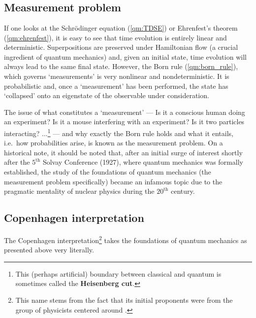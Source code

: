 \section{}
\subsection{Measurement problem}

    If one looks at the Schr\"odinger equation (\cref{qm:TDSE}) or Ehrenfest's theorem (\cref{qm:ehrenfest}), it is easy to see that time evolution is entirely linear and deterministic. Superpositions are preserved under Hamiltonian flow (a crucial ingredient of quantum mechanics) and, given an initial state, time evolution will always lead to the same final state. However, the Born rule (\cref{qm:born_rule}), which governs `measurements' is very nonlinear and nondeterministic. It is probabilistic and, once a `measurement' has been performed, the state has `collapsed' onto an eigenstate of the observable under consideration.

    The issue of what constitutes a `measurement' --- Is it a conscious human doing an experiment? Is it a mouse interfering with an experiment? Is it two particles interacting? ...\footnote{This (perhaps artificial) boundary between classical and quantum is sometimes called the \textbf{Heisenberg cut}.} --- and why exactly the Born rule holds and what it entails, i.e.~how probabilities arise, is known as the measurement problem. On a historical note, it should be noted that, after an initial surge of interest shortly after the $5^{\text{th}}$ Solvay Conference (1927), where quantum mechanics was formally established, the study of the foundations of quantum mechanics (the measurement problem specifically) became an infamous topic due to the pragmatic mentality of nuclear physics during the $20^{\text{th}}$ century.


\subsection{Copenhagen interpretation}

    The Copenhagen interpretation\footnote{This name stems from the fact that its initial proponents were from the group of physicists centered around .} takes the foundations of quantum mechanics as presented above very literally. 


